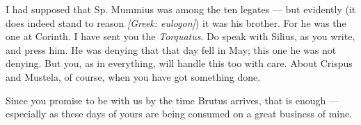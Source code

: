 

 I had supposed that Sp. Mummius was among the ten legates --- but evidently (it does indeed stand to reason \textit{[Greek: eulogon]}) it was his brother. For he was the one at Corinth. I have sent you the \textit{Torquatus}. Do speak with Silius, as you write, and press him. He was denying that that day fell in May; this one he was not denying. But you, as in everything, will handle this too with care. About Crispus and Mustela, of course, when you have got something done.

 Since you promise to be with us by the time Brutus arrives, that is enough --- especially as these days of yours are being consumed on a great business of mine.
